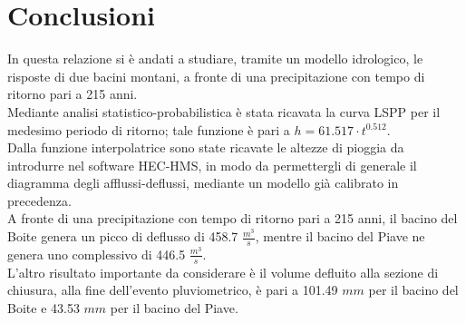 \section{Conclusioni}
In questa relazione si è andati a studiare, tramite un modello idrologico, le risposte di due bacini montani, a fronte di una precipitazione con tempo di ritorno pari a 215 anni.\\
Mediante analisi statistico-probabilistica è stata ricavata la curva LSPP per il medesimo periodo di ritorno; tale funzione è pari a $h=61.517 \cdot t ^{0.512}$.\\
Dalla funzione interpolatrice sono state ricavate le altezze di pioggia da introdurre nel software HEC-HMS, in modo da permettergli di generale il diagramma degli afflussi-deflussi, mediante un modello già calibrato in precedenza.\\
A fronte di una precipitazione con tempo di ritorno pari a 215 anni, il bacino del Boite genera un picco di deflusso di 458.7 $\frac{m^3}{s}$, mentre il bacino del Piave ne genera uno complessivo di 446.5 $\frac{m^3}{s}$.\\
L'altro risultato importante da considerare è il volume defluito alla sezione di chiusura, alla fine dell'evento pluviometrico, è pari a 101.49 $mm$ per il bacino del Boite e 43.53 $mm$ per il bacino del Piave.